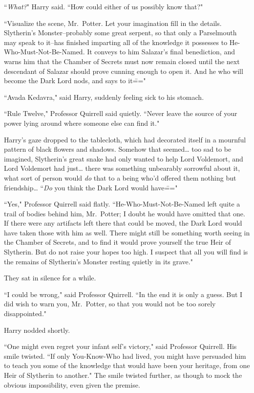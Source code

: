 ``\emph{What?}" Harry said. ``How could either of us possibly know that?"

``Visualize the scene, Mr.~Potter. Let your imagination fill in the details. Slytherin's Monster\---probably some great serpent, so that only a Parselmouth may speak to it\---has finished imparting all of the knowledge it possesses to He-Who-Must-Not-Be-Named. It conveys to him Salazar's final benediction, and warns him that the Chamber of Secrets must now remain closed until the next descendant of Salazar should prove cunning enough to open it. And he who will become the Dark Lord nods, and says to it\==="

``Avada Kedavra," said Harry, suddenly feeling sick to his stomach.

``Rule Twelve," Professor Quirrell said quietly. ``Never leave the source of your power lying around where someone else can find it."

Harry's gaze dropped to the tablecloth, which had decorated itself in a mournful pattern of black flowers and shadows. Somehow that seemed{\ldots} too sad to be imagined, Slytherin's great snake had only wanted to help Lord Voldemort, and Lord Voldemort had just{\ldots} there was something unbearably sorrowful about it, what sort of person would \emph{do} that to a being who'd offered them nothing but friendship{\ldots} ``\emph{Do} you think the Dark Lord would have\==="

``Yes," Professor Quirrell said flatly. ``He-Who-Must-Not-Be-Named left quite a trail of bodies behind him, Mr.~Potter; I doubt he would have omitted that one. If there were any artifacts left there that could be moved, the Dark Lord would have taken those with him as well. There might still be something worth seeing in the Chamber of Secrets, and to find it would prove yourself the true Heir of Slytherin. But do not raise your hopes too high. I suspect that all you will find is the remains of Slytherin's Monster resting quietly in its grave."

They sat in silence for a while.

``I could be wrong," said Professor Quirrell. ``In the end it is only a guess. But I did wish to warn you, Mr.~Potter, so that you would not be too sorely disappointed."

Harry nodded shortly.

``One might even regret your infant self's victory," said Professor Quirrell. His smile twisted. ``If only You-Know-Who had lived, you might have persuaded him to teach you some of the knowledge that would have been your heritage, from one Heir of Slytherin to another." The smile twisted further, as though to mock the obvious impossibility, even given the premise.

